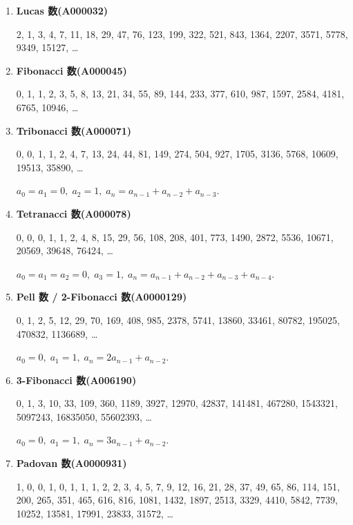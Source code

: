\begin{enumerate}
    \item \textbf{Lucas 数(A000032)}
          
          2, 1, 3, 4, 7, 11, 18, 29, 47, 76, 123, 199, 322, 521, 843, 1364, 2207, 3571, 5778, 9349, 15127, \dots
          
    \item \textbf{Fibonacci 数(A000045)}
          
          0, 1, 1, 2, 3, 5, 8, 13, 21, 34, 55, 89, 144, 233, 377, 610, 987, 1597, 2584, 4181, 6765, 10946, \dots
          
    \item \textbf{Tribonacci 数(A000071)}
          
          0, 0, 1, 1, 2, 4, 7, 13, 24, 44, 81, 149, 274, 504, 927, 1705, 3136, 5768, 10609, 19513, 35890, \dots
          
          \( a_0 = a_1 = 0,\; a_2 = 1,\; a_n = a_{n - 1} + a_{n - 2} + a_{n - 3} \).
          
    \item \textbf{Tetranacci 数(A000078)}
          
          0, 0, 0, 1, 1, 2, 4, 8, 15, 29, 56, 108, 208, 401, 773, 1490, 2872, 5536, 10671, 20569, 39648, 76424, \dots
          
          \( a_0 = a_1 = a_2 = 0,\; a_3 = 1,\; a_n = a_{n - 1} + a_{n - 2} + a_{n - 3} + a_{n - 4} \).
          
    \item \textbf{Pell 数 / 2-Fibonacci 数(A0000129)}
          
          0, 1, 2, 5, 12, 29, 70, 169, 408, 985, 2378, 5741, 13860, 33461, 80782, 195025, 470832, 1136689, \dots
          
          \( a_0 = 0,\; a_1 = 1,\; a_n = 2a_{n - 1} + a_{n - 2} \).
          
    \item \textbf{3-Fibonacci 数(A006190)}
          
          0, 1, 3, 10, 33, 109, 360, 1189, 3927, 12970, 42837, 141481, 467280, 1543321, 5097243, 16835050, 55602393, \dots
          
          \( a_0 = 0,\; a_1 = 1,\; a_n = 3a_{n - 1} + a_{n - 2} \).
          
    \item \textbf{Padovan 数(A0000931)}
          
          1, 0, 0, 1, 0, 1, 1, 1, 2, 2, 3, 4, 5, 7, 9, 12, 16, 21, 28, 37, 49, 65, 86, 114, 151, 200, 265, 351, 465, 616, 816, 1081, 1432, 1897, 2513, 3329, 4410, 5842, 7739, 10252, 13581, 17991, 23833, 31572, \dots
          

\end{enumerate}

